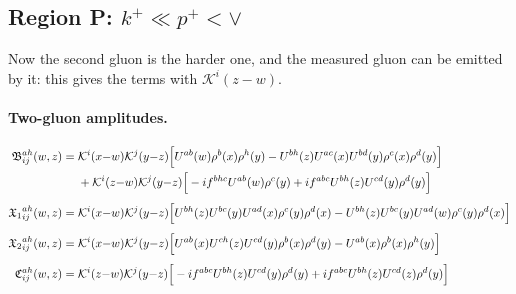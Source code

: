 \documentclass[aps,prd,onecolumn,superscriptaddress,nofootinbib,floatfix,longbibliography,11pt]{revtex4-2}
\numberwithin{equation}{section}
\newcommand{\KK}{\mathcal{K}}
\begin{document}
\subsection{Region P: \texorpdfstring{$k^+\ll p^+<\vee$}{k+<<p+<vee}}
Now the second gluon is the harder one, and the measured gluon can be emitted by it: this gives the terms with $\KK^i(z-w)$.
\paragraph*{Two-gluon amplitudes.}
{\small
\begin{align}
\mathfrak B^{ah}_{ij}(w,z)=\;&\KK^{i}(x{-}w)\KK^{j}(y{-}z)\Big[U^{ab}(w)\rho^{b}(x)\rho^{h}(y)-U^{bh}(z)U^{ac}(x)U^{bd}(y)\rho^{c}(x)\rho^{d}(y)\Big]\notag\\
&+\KK^{i}(z{-}w)\KK^{j}(y{-}z)\Big[-if^{bhc}U^{ab}(w)\rho^{c}(y)+if^{abc}U^{bh}(z)U^{cd}(y)\rho^{d}(y)\Big]\label{eq:LLP2PB}
\\[4pt]
{\mathfrak X_1}^{ah}_{ij}(w,z)=\;&\KK^{i}(x{-}w)\KK^{j}(y{-}z)\Big[U^{bh}(z)U^{bc}(y)U^{ad}(x)\rho^{c}(y)\rho^{d}(x)-U^{bh}(z)U^{bc}(y)U^{ad}(w)\rho^{c}(y)\rho^{d}(x)\Big]\label{eq:LLP2PX1}
\\[4pt]
{\mathfrak X_2}^{ah}_{ij}(w,z)=\;&\KK^{i}(x{-}w)\KK^{j}(y{-}z)\Big[U^{ab}(x)U^{ch}(z)U^{cd}(y)\rho^{b}(x)\rho^{d}(y)-U^{ab}(x)\rho^{b}(x)\rho^{h}(y)\Big]\label{eq:LLP2PX2}
\\[4pt]
\mathfrak C^{ah}_{ij}(w,z)=\;&\KK^{i}(z{-}w)\KK^{j}(y{-}z)\Big[-if^{abc}U^{bh}(z)U^{cd}(y)\rho^{d}(y)+if^{abc}U^{bh}(z)U^{cd}(z)\rho^{d}(y)\Big]\label{eq:LLP2PC}
\end{align}
}
\end{document}
